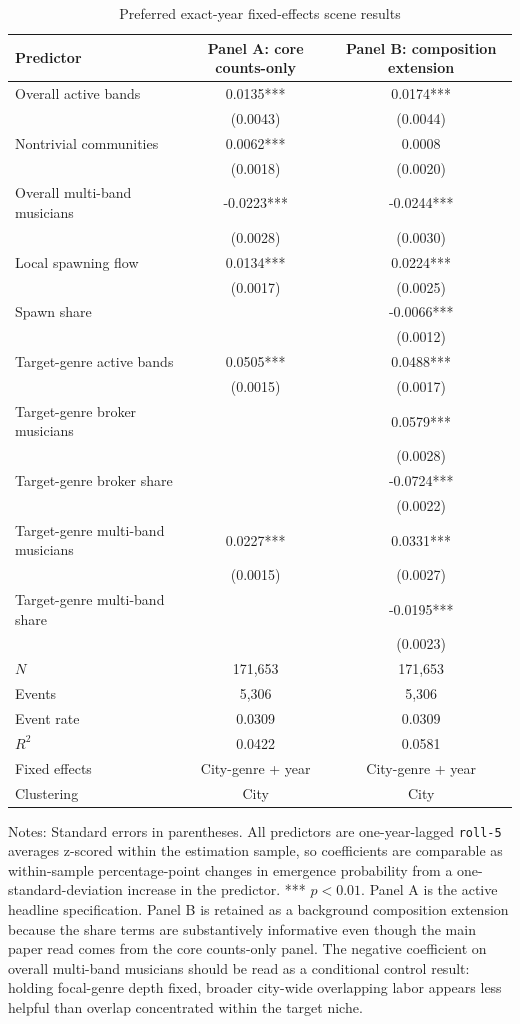 \begin{table}[htbp]
\centering
\caption{Preferred exact-year fixed-effects scene results}
\label{tab:preferred_results}
\small
\begin{tabular}{@{}lcc@{}}
\toprule
Predictor & Panel A: core counts-only & Panel B: composition extension \\
\midrule
Overall active bands & 0.0135*** & 0.0174*** \\
 & (0.0043) & (0.0044) \\
Nontrivial communities & 0.0062*** & 0.0008 \\
 & (0.0018) & (0.0020) \\
Overall multi-band musicians & -0.0223*** & -0.0244*** \\
 & (0.0028) & (0.0030) \\
Local spawning flow & 0.0134*** & 0.0224*** \\
 & (0.0017) & (0.0025) \\
Spawn share &  & -0.0066*** \\
 &  & (0.0012) \\
Target-genre active bands & 0.0505*** & 0.0488*** \\
 & (0.0015) & (0.0017) \\
Target-genre broker musicians &  & 0.0579*** \\
 &  & (0.0028) \\
Target-genre broker share &  & -0.0724*** \\
 &  & (0.0022) \\
Target-genre multi-band musicians & 0.0227*** & 0.0331*** \\
 & (0.0015) & (0.0027) \\
Target-genre multi-band share &  & -0.0195*** \\
 &  & (0.0023) \\
\midrule
$N$ & 171,653 & 171,653 \\
Events & 5,306 & 5,306 \\
Event rate & 0.0309 & 0.0309 \\
$R^2$ & 0.0422 & 0.0581 \\
Fixed effects & City-genre + year & City-genre + year \\
Clustering & City & City \\
\bottomrule
\end{tabular}

\vspace{0.4em}
\parbox{0.96\textwidth}{\footnotesize Notes: Standard errors in parentheses. All predictors are
one-year-lagged \texttt{roll-5} averages z-scored within the estimation sample, so coefficients are
comparable as within-sample percentage-point changes in emergence probability from a
one-standard-deviation increase in the predictor. *** $p<0.01$. Panel A is the active headline
specification. Panel B is retained as a background composition extension because the share terms
are substantively informative even though the main paper read comes from the core counts-only
panel. The negative coefficient on overall multi-band musicians should be read as a conditional
control result: holding focal-genre depth fixed, broader city-wide overlapping labor appears less
helpful than overlap concentrated within the target niche.}
\end{table}
